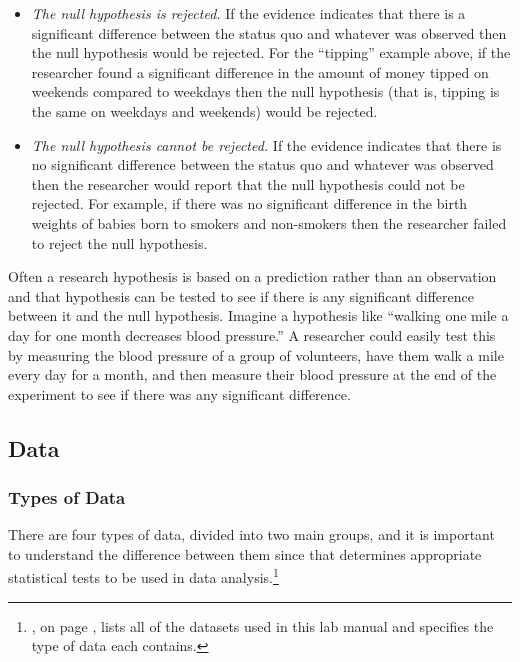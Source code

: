 \begin{itemize}
  \item \textit{The null hypothesis is rejected.} If the evidence indicates that there is a significant difference between the status quo and whatever was observed then the null hypothesis would be rejected. For the ``tipping'' example above, if the researcher found a significant difference in the amount of money tipped on weekends compared to weekdays then the null hypothesis (that is, tipping is the same on weekdays and weekends) would be rejected.
  \item \textit{The null hypothesis cannot be rejected.} If the evidence indicates that there is no significant difference between the status quo and whatever was observed then the researcher would report that the null hypothesis could not be rejected. For example, if there was no significant difference in the birth weights of babies born to smokers and non-smokers then the researcher failed to reject the null hypothesis.
\end{itemize}

Often a research hypothesis is based on a prediction rather than an observation and that hypothesis can be tested to see if there is any significant difference between it and the null hypothesis. Imagine a hypothesis like ``walking one mile a day for one month decreases blood pressure.'' A researcher could easily test this by measuring the blood pressure of a group of volunteers, have them walk a mile every day for a month, and then measure their blood pressure at the end of the experiment to see if there was any significant difference.

\subsection{Data}\label{intro:TypesOfData}

\subsubsection{Types of Data}

There are four types of data, divided into two main groups, and it is important to understand the difference between them since that determines appropriate statistical tests to be used in data analysis.\footnote{, on page \pageref{app:a}, lists all of the datasets used in this lab manual and specifies the type of data each contains.}

